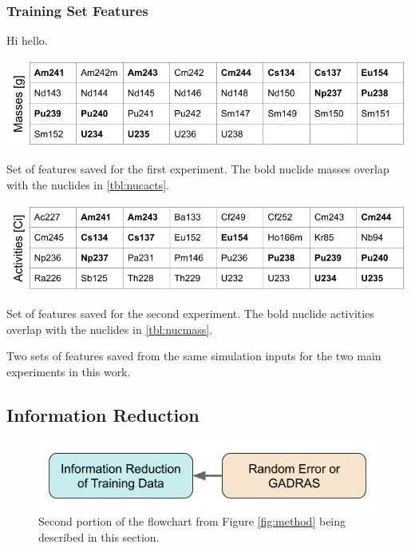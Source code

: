\subsubsection{Training Set Features}
\label{sec:snffeats}

Hi hello.

\begin{table}[!h]
  \centering
  \begin{subtable}{\linewidth}
    \centering
    \includegraphics[width=\linewidth]{./chapters/method/nucmass_feats.png}
    \caption{Set of features saved for the first experiment. The bold nuclide
             masses overlap with the nuclides in \ref{tbl:nucacts}.}
    \label{tbl:nucmass}
    \vspace*{5mm}
  \end{subtable}
  \begin{subtable}{\linewidth}
    \centering
    \includegraphics[width=\linewidth]{./chapters/method/nucacts_feats.png}
    \caption{Set of features saved for the second experiment. The bold nuclide
             activities overlap with the nuclides in \ref{tbl:nucmass}.}
    \label{tbl:nucacts}
  \end{subtable}%
  \caption{Two sets of features saved from the same simulation inputs for the 
           two main experiments in this work.}
  \label{tbl:nucfeats}
\end{table}

\subsection{Information Reduction}
\label{sec:inforeduc}

\begin{figure}[H]
  \centering
  \includegraphics[width=0.7\linewidth]{./chapters/method/methodology2.png}
  \caption{Second portion of the flowchart from Figure \ref{fig:method} being 
           described in this section.}
\end{figure}

